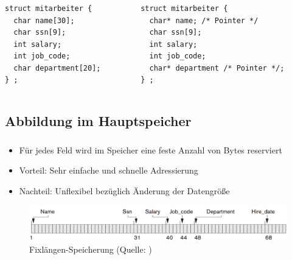 \begin{frame}[fragile]
	\frametitle{\insertsection}
	\framesubtitle{\insertsubsection}
\begin{columns}
\begin{column}{.48\textwidth}
    \lstset{language=c}
    \begin{lstlisting}[xleftmargin=3ex]
struct mitarbeiter {
  char name[30];
  char ssn[9];
  int salary;
  int job_code;
  char department[20];
} ;
    \end{lstlisting}
\end{column}
\begin{column}{.48\textwidth}
    \lstset{language=C}
    \begin{lstlisting}[xleftmargin=3ex]
struct mitarbeiter {
  char* name; /* Pointer */
  char ssn[9];
  int salary;
  int job_code;
  char* department /* Pointer */;
} ;
    \end{lstlisting}
\end{column}
\end{columns}
\end{frame}

\subsection{Abbildung im Hauptspeicher}

\begin{frame}
	\frametitle{\insertsection}
	\framesubtitle{\insertsubsection}
	\begin{itemize}
		\item F\"ur jedes Feld wird im Speicher eine feste Anzahl von Bytes reserviert 
		\item Vorteil: Sehr einfache und schnelle Adressierung
		\item Nachteil: Unflexibel bez\"uglich \"Anderung der Datengr\"o\ss e
	\end{itemize}	
	 \begin{figure}
	 	\includegraphics[scale=0.13]{img/fix.png}
	 	\caption{Fixlängen-Speicherung (Quelle: \cite[S. 596]{EN10})}
	 \end{figure}
\end{frame}

